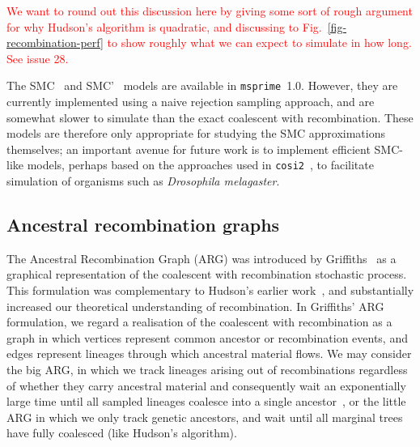 \documentclass{article}
\newcommand{\msprime}[0]{\texttt{msprime}}
\newcommand{\jkcomment}[1]{\textcolor{red}{#1}}
\begin{document}
\jkcomment{We want to round out this discussion here by giving some
sort of rough argument for why Hudson's algorithm is quadratic, and discussing
to Fig.~\ref{fig-recombination-perf} to show roughly what we can expect
to simulate in how long. See issue 28.}

The SMC~\citep{mcvean2005approximating} and
SMC'~\citep{marjoram2006fast} models are available
in \msprime\ 1.0. However, they are currently implemented using a
naive rejection sampling approach, and are somewhat slower
to simulate than the exact coalescent with recombination. These
models are therefore only appropriate for studying the SMC approximations
themselves; an important avenue for future work is to implement
efficient SMC-like models, perhaps based on the approaches used
in \texttt{cosi2}~\citep{shlyakhter2014cosi2}, to facilitate
simulation of organisms such as \textit{Drosophila melagaster}.


\subsection{Ancestral recombination graphs}

The Ancestral Recombination Graph (ARG) was introduced by
Griffiths~\citep{griffiths1991two,griffiths1997ancestral} as a graphical
representation of the coalescent with recombination stochastic process. This
formulation was complementary to Hudson's earlier
work~\citep{hudson1983properties}, and substantially increased our theoretical
understanding of recombination. In Griffiths' ARG formulation, we
regard a realisation of the coalescent with recombination as a graph in which
vertices represent common ancestor or recombination events, and edges represent
lineages through which ancestral material flows.
We may consider the big ARG, in which we track lineages arising out of
recombinations regardless of whether they carry ancestral material and
consequently wait an exponentially large time until all sampled lineages
coalesce into a single ancestor~\citep{ethier1990two}, or the little ARG in
which we only track genetic ancestors, and wait until all marginal trees
have fully coalesced (like Hudson's algorithm).
\end{document}
